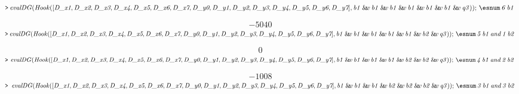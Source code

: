 \documentclass{article}
\begin{document}
\mapleinput
{$ \displaystyle \texttt{>\,} \mathit{evalDG} (\mathit{Hook} ([\textit{D\_x1} ,\textit{D\_x2} ,\textit{D\_x3} ,\textit{D\_x4} ,\textit{D\_x5} ,\textit{D\_x6} ,\textit{D\_x7} ,\textit{D\_y0} ,\textit{D\_y1} ,\textit{D\_y2} ,\textit{D\_y3} ,\textit{D\_y4} ,\textit{D\_y5} ,\textit{D\_y6} ,\textit{D\_y7}],\mathit{b1} \:\&\!\!w \,\mathit{b1} \:\&\!\!w \,\mathit{b1} \:\&\!\!w \,\mathit{b1} \:\&\!\!w \,\mathit{b1} \:\&\!\!w \,\mathit{b1} \:\&\!\!w \,\mathit{q3}));\,\esnum \mathit{\,6\,b1\,}  $}

\begin{dmath}\label{(43)}
-5040
\end{dmath}
\mapleinput
{$ \displaystyle \texttt{>\,} \mathit{evalDG} (\mathit{Hook} ([\textit{D\_x1} ,\textit{D\_x2} ,\textit{D\_x3} ,\textit{D\_x4} ,\textit{D\_x5} ,\textit{D\_x6} ,\textit{D\_x7} ,\textit{D\_y0} ,\textit{D\_y1} ,\textit{D\_y2} ,\textit{D\_y3} ,\textit{D\_y4} ,\textit{D\_y5} ,\textit{D\_y6} ,\textit{D\_y7}],\mathit{b1} \:\&\!\!w \,\mathit{b1} \:\&\!\!w \,\mathit{b1} \:\&\!\!w \,\mathit{b1} \:\&\!\!w \,\mathit{b1} \:\&\!\!w \,\mathit{b2} \:\&\!\!w \,\mathit{q3}));\,\esnum \mathit{\,5\,b1\,and\,1\,b2\,}  $}

\begin{dmath}\label{(44)}
0
\end{dmath}
\mapleinput
{$ \displaystyle \texttt{>\,} \,\mathit{evalDG} (\mathit{Hook} ([\textit{D\_x1} ,\textit{D\_x2} ,\textit{D\_x3} ,\textit{D\_x4} ,\textit{D\_x5} ,\textit{D\_x6} ,\textit{D\_x7} ,\textit{D\_y0} ,\textit{D\_y1} ,\textit{D\_y2} ,\textit{D\_y3} ,\textit{D\_y4} ,\textit{D\_y5} ,\textit{D\_y6} ,\textit{D\_y7}],\mathit{b1} \:\&\!\!w \,\mathit{b1} \:\&\!\!w \,\mathit{b1} \:\&\!\!w \,\mathit{b1} \:\&\!\!w \,\mathit{b2} \:\&\!\!w \,\mathit{b2} \:\&\!\!w \,\mathit{q3}));\,\esnum \mathit{\,4\,b1\,and\,2\,b2\,}  $}

\begin{dmath}\label{(45)}
-1008
\end{dmath}
\mapleinput
{$ \displaystyle \texttt{>\,} \,\,\mathit{evalDG} (\mathit{Hook} ([\textit{D\_x1} ,\textit{D\_x2} ,\textit{D\_x3} ,\textit{D\_x4} ,\textit{D\_x5} ,\textit{D\_x6} ,\textit{D\_x7} ,\textit{D\_y0} ,\textit{D\_y1} ,\textit{D\_y2} ,\textit{D\_y3} ,\textit{D\_y4} ,\textit{D\_y5} ,\textit{D\_y6} ,\textit{D\_y7}],\mathit{b1} \:\&\!\!w \,\mathit{b1} \:\&\!\!w \,\mathit{b1} \:\&\!\!w \,\mathit{b2} \:\&\!\!w \,\mathit{b2} \:\&\!\!w \,\mathit{b2} \:\&\!\!w \,\mathit{q3}));\,\esnum \mathit{\,3\,b1\,and\,3\,b2\,}  $}
\end{document}

